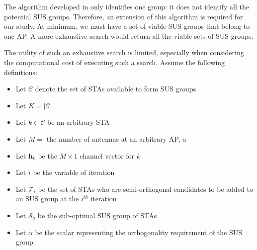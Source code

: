 The algorithm developed in \cite{1603708} only identifies one group: it does not identify all the potential SUS groups. Therefore, an extension of this algorithm is required for our study. At minimum, we must have a set of viable SUS groups that belong to one AP. A more exhaustive search would return all the viable sets of SUS groups. 

The utility of such an exhaustive search is limited, especially when considering the computational cost of executing such a search.
Assume the following definitions:
\begin{itemize}
    \item Let $\mathcal{C}$ denote the set of STAs available to form SUS groups
    \item Let $K = \vert \mathcal{C} \vert $
    \item Let $k \in \mathcal{C}$ be an arbitrary STA
    \item Let $M = $ the number of antennas at an arbitrary AP, $a$
    \item Let $\textbf{h}_k$ be the $M \times 1$ channel vector for $k$
    \item Let $i$ be the variable of iteration
    \item Let $\mathcal{T}_i$ be the set of STAs who are semi-orthogonal candidates to be added to an SUS group at the $i^{th}$ iteration
    \item Let $\mathcal{S}_o$ be the sub-optimal SUS group of STAs
    \item Let $\alpha$ be the scalar representing the orthogonality requirement of the SUS group
\end{itemize}
